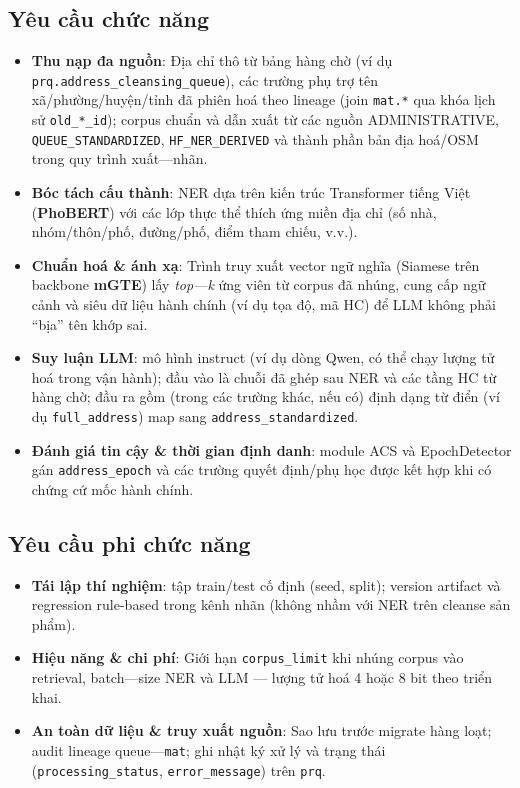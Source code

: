 \subsection{Yêu cầu chức năng}
\begin{itemize}
  \item \textbf{Thu nạp đa nguồn}: Địa chỉ thô từ bảng hàng chờ (ví dụ \texttt{prq.address\_cleansing\_queue}), các trường phụ trợ tên xã/phường/huyện/tỉnh đã phiên hoá theo lineage (join \texttt{mat.*} qua khóa lịch sử \texttt{old\_*\_id}); corpus chuẩn và dẫn xuất từ các nguồn ADMINISTRATIVE, \texttt{QUEUE\_STANDARDIZED}, \texttt{HF\_NER\_DERIVED} và thành phần bản địa hoá/OSM trong quy trình xuất---nhãn.
  \item \textbf{Bóc tách cấu thành}: NER dựa trên kiến trúc Transformer tiếng Việt (\textbf{PhoBERT}) với các lớp thực thể thích ứng miền địa chỉ (số nhà, nhóm/thôn/phố, đường/phố, điểm tham chiếu, v.v.).
  \item \textbf{Chuẩn hoá \& ánh xạ}: Trình truy xuất vector ngữ nghĩa (Siamese trên backbone \textbf{mGTE}) lấy \emph{top---k} ứng viên từ corpus đã nhúng, cung cấp ngữ cảnh và siêu dữ liệu hành chính (ví dụ tọa độ, mã HC) để LLM không phải ``bịa'' tên khớp sai.
  \item \textbf{Suy luận LLM}: mô hình instruct (ví dụ dòng Qwen, có thể chạy lượng tử hoá trong vận hành); đầu vào là chuỗi đã ghép sau NER và các tầng HC từ hàng chờ; đầu ra gồm (trong các trường khác, nếu có) định dạng từ điển (ví dụ \texttt{full\_address}) map sang \texttt{address\_standardized}.
  \item \textbf{Đánh giá tin cậy \& thời gian định danh}: module ACS và EpochDetector gán \texttt{address\_epoch} và các trường quyết định/phụ học được kết hợp khi có chứng cứ mốc hành chính.
\end{itemize}

\subsection{Yêu cầu phi chức năng}
\begin{itemize}
  \item \textbf{Tái lập thí nghiệm}: tập train/test cố định (seed, split); version artifact và regression rule-based trong kênh nhãn (không nhầm với NER trên cleanse sản phẩm).
  \item \textbf{Hiệu năng \& chi phí}: Giới hạn \texttt{corpus\_limit} khi nhúng corpus vào retrieval, batch---size NER và LLM --- lượng tử hoá 4 hoặc 8 bit theo triển khai.
  \item \textbf{An toàn dữ liệu \& truy xuất nguồn}: Sao lưu trước migrate hàng loạt; audit lineage queue---\texttt{mat}; ghi nhật ký xử lý và trạng thái (\texttt{processing\_status}, \texttt{error\_message}) trên \texttt{prq}.
\end{itemize}

